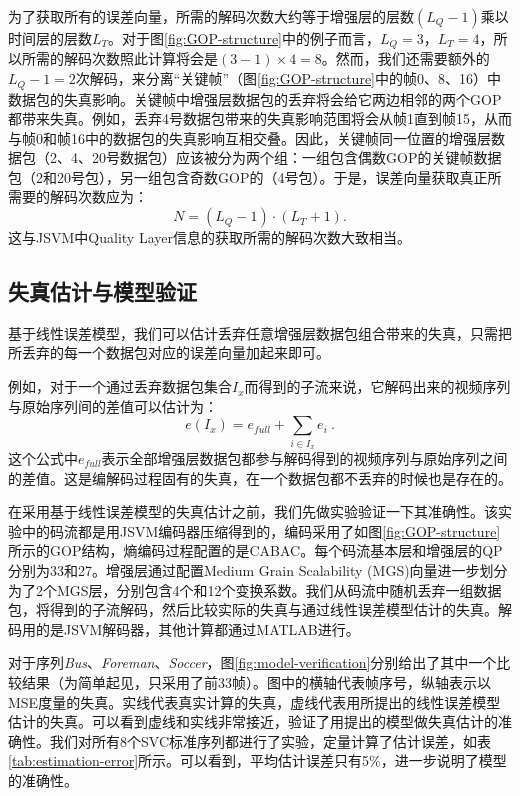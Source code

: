 为了获取所有的误差向量，所需的解码次数大约等于增强层的层数$(L_Q - 1)$乘以时间层的层数$L_T$。对于图\ref{fig:GOP-structure}中的例子而言，$L_Q = 3$，$L_T = 4$，所以所需的解码次数照此计算将会是$(3 - 1) \times 4 = 8$。然而，我们还需要额外的$L_Q - 1 = 2$次解码，来分离“关键帧”\supercite{H.264-Overview}（图\ref{fig:GOP-structure}中的帧0、8、16）中数据包的失真影响。关键帧中增强层数据包的丢弃将会给它两边相邻的两个GOP都带来失真。例如，丢弃4号数据包带来的失真影响范围将会从帧1直到帧15，从而与帧0和帧16中的数据包的失真影响互相交叠。因此，关键帧同一位置的增强层数据包（2、4、20号数据包）应该被分为两个组：一组包含偶数GOP的关键帧数据包（2和20号包），另一组包含奇数GOP的（4号包）。于是，误差向量获取真正所需要的解码次数应为：
\begin{equation}
N = (L_Q - 1) \cdot (L_T + 1).
\end{equation}
这与JSVM中Quality Layer信息的获取所需的解码次数大致相当。

\subsection{失真估计与模型验证}
\label{subsec:distortion-estimation}

基于线性误差模型，我们可以估计丢弃任意增强层数据包组合带来的失真，只需把所丢弃的每一个数据包对应的误差向量加起来即可。

例如，对于一个通过丢弃数据包集合$I_x$而得到的子流来说，它解码出来的视频序列与原始序列间的差值可以估计为：
\begin{equation}
\label{eq:subset_error}
e(I_x) = e_{full} + \sum_{i \in {I_x}} e_i \: .
\end{equation}
这个公式中$e_{full}$表示全部增强层数据包都参与解码得到的视频序列与原始序列之间的差值。这是编解码过程固有的失真，在一个数据包都不丢弃的时候也是存在的。

在采用基于线性误差模型的失真估计之前，我们先做实验验证一下其准确性。该实验中的码流都是用JSVM编码器压缩得到的，编码采用了如图\ref{fig:GOP-structure}所示的GOP结构，熵编码过程配置的是CABAC。每个码流基本层和增强层的QP分别为33和27。增强层通过配置Medium Grain Scalability (MGS)向量进一步划分为了2个MGS层，分别包含4个和12个变换系数。我们从码流中随机丢弃一组数据包，将得到的子流解码，然后比较实际的失真与通过线性误差模型估计的失真。解码用的是JSVM解码器，其他计算都通过MATLAB进行。

对于序列{\em Bus}、{\em Foreman}、{\em Soccer}，图\ref{fig:model-verification}分别给出了其中一个比较结果（为简单起见，只采用了前33帧）。图中的横轴代表帧序号，纵轴表示以MSE度量的失真。实线代表真实计算的失真，虚线代表用所提出的线性误差模型估计的失真。可以看到虚线和实线非常接近，验证了用提出的模型做失真估计的准确性。我们对所有8个SVC标准序列都进行了实验，定量计算了估计误差，如表\ref{tab:estimation-error}所示。可以看到，平均估计误差只有5\%，进一步说明了模型的准确性。


